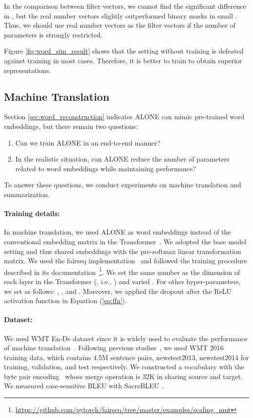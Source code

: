 \documentclass{article}
\begin{document}
In the comparison between filter vectors, we cannot find the significant difference in , but the real number vectors slightly outperformed binary masks in small .
Thus, we should use real number vectors as the filter vectors if the number of parameters is strongly restricted.

Figure \ref{fig:word_sim_result} shows that the setting without training  is defeated against training  in most cases.
Therefore, it is better to train  to obtain superior representations.


\subsection{Machine Translation}\label{sec:mt}
Section \ref{sec:word_reconstruction} indicates ALONE can mimic pre-trained word embeddings, but there remain two questions:
\begin{enumerate}
  \item Can we train ALONE in an end-to-end manner?
  \item In the realistic situation, can ALONE reduce the number of parameters related to word embeddings while maintaining performance?
\end{enumerate}
To answer these questions, we conduct experiments on machine translation and summarization.


\paragraph{Training details:}
In machine translation, we used ALONE as word embeddings instead of the conventional embedding matrix  in the Transformer~\cite{NIPS2017_7181}.
We adopted the base model setting and thus shared embeddings with the pre-softmax linear transformation matrix.
We used the fairseq implementation~\cite{ott-etal-2019-fairseq} and followed the training procedure described in its documentation~\footnote{\href{https://github.com/pytorch/fairseq/tree/master/examples/scaling_nmt}{https://github.com/pytorch/fairseq/tree/master/examples/scaling\_nmt}}.
We set  the same number as the dimension of each layer in the Transformer (, i.e., ) and varied .
For other hyper-parameters, we set as follows: , , and .
Moreover, we applied the dropout after the ReLU activation function in Equation (\ref{eq:ffn}).

\paragraph{Dataset:}
We used WMT En-De dataset since it is widely used to evaluate the performance of machine translation~\cite{pmlr-v70-gehring17a,NIPS2017_7181,ott-etal-2018-scaling}.
Following previous studies~\cite{NIPS2017_7181,ott-etal-2018-scaling}, we used WMT 2016 training data, which contains 4.5M sentence pairs, newstest2013, newstest2014 for training, validation, and test respectively.
We constructed a vocabulary with the byte pair encoding~\cite{sennrich-etal-2016-neural} whose merge operation is 32K in sharing source and target.
We measured case-sensitive BLEU with SacreBLEU~\cite{post-2018-call}.
\end{document}
